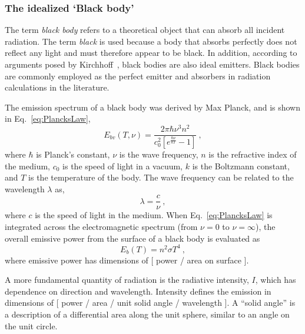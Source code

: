 \subsubsection{The idealized `Black body'}
The term \textit{black body} refers to a theoretical object that can absorb all incident radiation. The term \textit{black} is used because a body that absorbs perfectly does not reflect any light and must therefore appear to be black. In addition, according to arguments posed by Kirchhoff~\cite{Bergman2017FundamentalsTransfer}, black bodies are also ideal emitters.
Black bodies are commonly employed as the perfect emitter and absorbers in radiation calculations in the literature.

The emission spectrum of a black body was derived by Max Planck, and is shown in Eq.~\ref{eq:PlancksLaw},
\begin{equation}
    E_{bv}(T,\nu{}) = \frac{2\pi{}\hbar\nu{}^3n^2}{c_0^2\left[e^\frac{\hbar\nu{}}{kT}-1\right]}\ ,
    \label{eq:PlancksLaw}
\end{equation}
where $\hbar$ is Planck's constant, $\nu{}$ is the wave frequency, $n$ is the refractive index of the medium, $c_0$ is the speed of light in a vacuum, $k$ is the Boltzmann constant, and $T$ is the temperature of the body. The wave frequency can be related to the wavelength $\lambda$ as,
\begin{equation}
    \lambda{}=\frac{c}{\nu}\ ,
    \label{eq:FrequencyToWavelength}
\end{equation}
where $c$ is the speed of light in the medium. When Eq.~\ref{eq:PlancksLaw} is integrated across the electromagnetic spectrum (from $\nu=0$ to $\nu=\infty$), the overall emissive power from the surface of a black body is evaluated as
\begin{equation}
    E_b(T) = n^2\sigma{}T^4\ ,
    \label{eq:PlancksLawIntegrated}
\end{equation}
where emissive power has dimensions of [ power / area on surface ]. 

A more fundamental quantity of radiation is the radiative intensity, $I$, which has dependence on direction and wavelength. Intensity defines the emission in dimensions of [ power / area / unit solid angle / wavelength ]. %
A ``solid angle'' is a description of a differential area along the unit sphere, similar to an angle on the unit circle.

